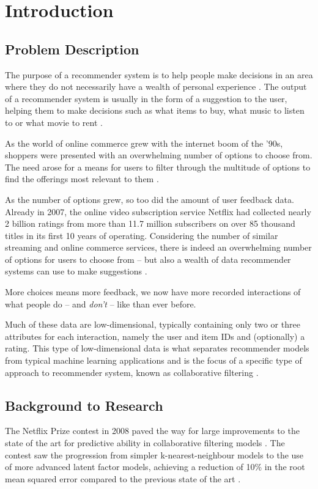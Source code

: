 \chapter{Introduction}

\label{intro} %

\section{Problem Description}
The purpose of a  recommender system is to help people make decisions in an area where they do not necessarily have a wealth of personal experience \parencite{rs_1.1_Resnick}. The output of a recommender system is usually in the form of a suggestion to the user, helping them to make decisions such as what items to buy, what music to listen to or what movie to rent \parencite{handbook_1.1_intro}.

As the world of online commerce grew with the internet boom of the '90s, shoppers were presented with an overwhelming number of options to choose from. The need arose for a means for users to filter through the multitude of options to find the offerings most relevant to them \parencite{handbook_1.1_intro}.

As the number of options grew, so too did the amount of user feedback data. Already in 2007, the online video subscription service Netflix had collected nearly 2 billion ratings from more than 11.7 million subscribers on over 85 thousand titles in its first 10 years of operating. Considering the number of similar streaming and online commerce services, there is indeed an overwhelming number of options for users to choose from -- but also a wealth of data recommender systems can use to make suggestions \parencite{netflix_description}.

More choices means more feedback, we now have more recorded interactions of what people do -- and \textit{don't} -- like than ever before.

Much of these data are low-dimensional, typically containing only two or three attributes for each interaction, namely the user and item IDs and (optionally) a rating. This type of low-dimensional data is what separates recommender models from typical machine learning applications and is the focus of a specific type of approach to recommender system, known as collaborative filtering \parencite{cf_1.5_explicit}.

\section{Background to Research}
The Netflix Prize contest in 2008 paved the way for large improvements to the state of the art for predictive ability in collaborative filtering models \parencite{netflix_description}. The contest saw the progression from simpler k-nearest-neighbour models to the use of more advanced latent factor models, achieving a reduction of 10\% in the root mean squared error compared to the previous state of the art \parencite{netflix_bellkor}.

